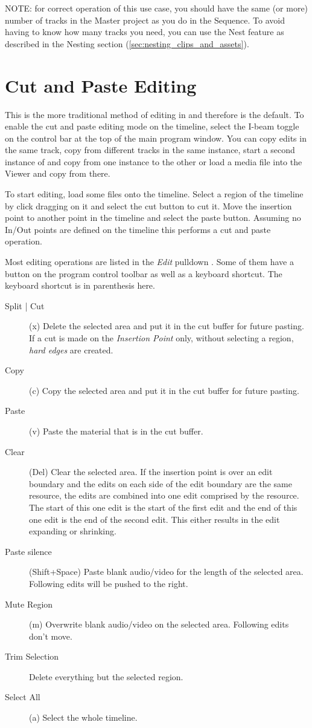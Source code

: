 NOTE: for correct operation of this use case, you should have the
same (or more) number of tracks in the Master project as you do in
the Sequence.  To avoid having to know how many tracks you need, you
can use the Nest feature as described in the Nesting section
(\ref{sec:nesting_clips_and_assets}).


\section{Cut and Paste Editing}%
\label{sec:cut_paste_editing}

This is the more traditional method of editing in \CGG{} and
therefore is the default.  To enable the cut and paste editing mode
on the timeline, select the I-beam  toggle on the control bar at the
top of the main program window. You can copy edits in the same
track, copy from different tracks in the same instance, start a
second instance of \CGG{} and copy from one instance to the other or
load a media file into the Viewer and copy from there.

To start editing, load some files onto the timeline.  Select a
region of the timeline by click dragging on it and select the cut
button to cut it. Move the insertion point to another point in the
timeline and select the paste button.  Assuming no In/Out points are
defined on the timeline this performs a cut and paste operation.

Most editing operations are listed in the \textit{Edit} pulldown . Some of
them have a button on the program control toolbar as well as a
keyboard shortcut.  The keyboard shortcut is in parenthesis here.

\begin{description}
\item [Split | Cut] (x) Delete the selected area and put it in
  the cut buffer for future pasting. If a cut is made on the \textit{Insertion Point} only, without selecting a region, \textit{hard edges} are created.
\item[Copy] (c) Copy the selected area and put it in the cut
  buffer for future pasting.
\item[Paste] (v) Paste the material that is in the cut buffer.
\item[Clear] (Del) Clear the selected area. If the insertion
  point is over an edit boundary and the edits on each side of the
  edit boundary are the same resource, the edits are combined into one
  edit comprised by the resource. The start of this one edit is the
  start of the first edit and the end of this one edit is the end of
  the second edit. This either results in the edit expanding or
  shrinking.
\item[Paste silence] (Shift+Space) Paste blank audio/video for
  the length of the selected area. Following edits will be pushed to
  the right.
\item[Mute Region] (m) Overwrite blank audio/video on the
  selected area. Following edits don't move.
\item[Trim Selection] Delete everything but the selected region.
\item[Select All] (a) Select the whole timeline.
\end{description}

